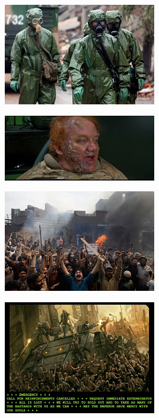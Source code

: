 \begin{figure}
	\begin{center}
		\includegraphics[width=\figwidth]{pics/6/21.png}
	\end{center}
\end{figure}

\begin{figure}
	\begin{center}
		\includegraphics[width=\figwidth]{pics/6/22.png}
	\end{center}
\end{figure}

\begin{figure}
	\begin{center}
		\includegraphics[width=\figwidth]{pics/6/23.png}
	\end{center}
\end{figure}

\begin{figure}
	\begin{center}
		\includegraphics[width=\figwidth]{pics/6/24.png}
	\end{center}
\end{figure}

